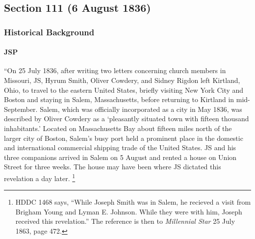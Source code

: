 \subsection{Section 111 (6 August 1836)}
	\label{DC111}
	
	\subsubsection{Historical Background}
		\label{DC111-HB}
		
		\paragraph{JSP}
		
			``On 25 July 1836, after writing two letters concerning church members in Missouri, JS, Hyrum Smith, Oliver Cowdery, and Sidney Rigdon left Kirtland, Ohio, to travel to the eastern United States, briefly visiting New York City and Boston and staying in Salem, Massachusetts, before returning to Kirtland in mid-September. Salem, which was officially incorporated as a city in May 1836, was described by Oliver Cowdery as a `pleasantly situated town with fifteen thousand inhabitants.' Located on Massachusetts Bay about fifteen miles north of the larger city of Boston, Salem's busy port held a prominent place in the domestic and international commercial shipping trade of the United States. JS and his three companions arrived in Salem on 5 August and rented a house on Union Street for three weeks. The house may have been where JS dictated this revelation a day later.%
				\footnote{%
					HDDC 1468 says, ``While Joseph Smith was in Salem, he recieved a visit from Brigham Young and Lyman E. Johnson. While they were with him, Joseph received this revelation.'' The reference is then to \textit{Millennial Star} 25 July 1863, page 472.
					}

